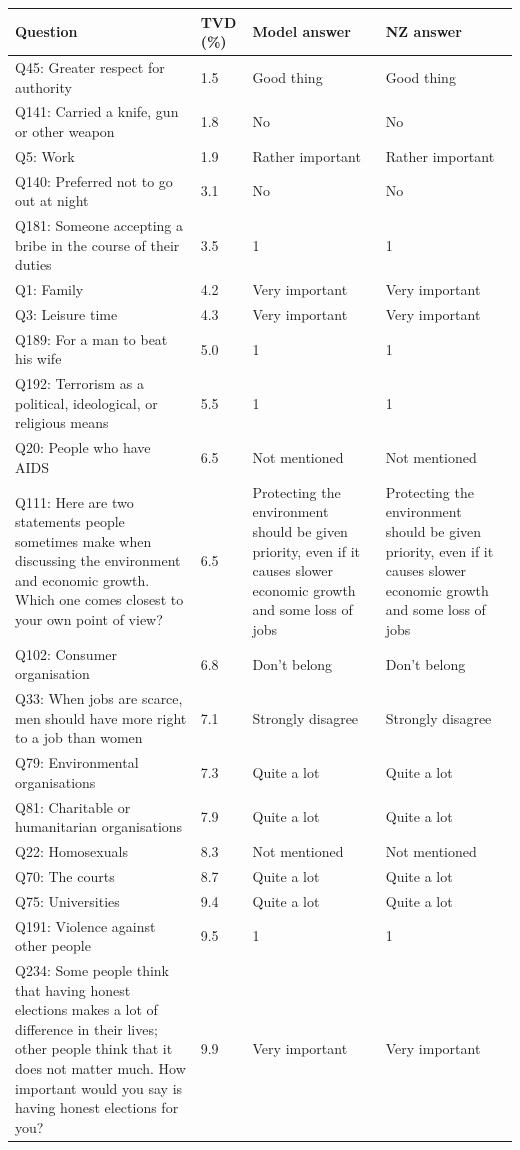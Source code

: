 \begin{tabular}{p{3.1in}lp{1.05in}p{1.05in}}
\toprule
Question & TVD (\%) & Model answer & NZ answer \\
\midrule
Q45: Greater respect for authority & 1.5 & Good thing & Good thing \\
Q141: Carried a knife, gun or other weapon & 1.8 & No & No \\
Q5: Work & 1.9 & Rather important & Rather important \\
Q140: Preferred not to go out at night & 3.1 & No & No \\
Q181: Someone accepting a bribe in the course of their duties & 3.5 & 1 & 1 \\
Q1: Family & 4.2 & Very important & Very important \\
Q3: Leisure time & 4.3 & Very important & Very important \\
Q189: For a man to beat his wife & 5.0 & 1 & 1 \\
Q192: Terrorism as a political, ideological, or religious means & 5.5 & 1 & 1 \\
Q20: People who have AIDS & 6.5 & Not mentioned & Not mentioned \\
Q111: Here are two statements people sometimes make when discussing the environment and economic growth. Which one comes closest to your own point of view? & 6.5 & Protecting the environment should be given priority, even if it causes slower economic growth and some loss of jobs & Protecting the environment should be given priority, even if it causes slower economic growth and some loss of jobs \\
Q102: Consumer organisation & 6.8 & Don't belong & Don't belong \\
Q33: When jobs are scarce, men should have more right to a job than women & 7.1 & Strongly disagree & Strongly disagree \\
Q79: Environmental organisations & 7.3 & Quite a lot & Quite a lot \\
Q81: Charitable or humanitarian organisations & 7.9 & Quite a lot & Quite a lot \\
Q22: Homosexuals & 8.3 & Not mentioned & Not mentioned \\
Q70: The courts & 8.7 & Quite a lot & Quite a lot \\
Q75: Universities & 9.4 & Quite a lot & Quite a lot \\
Q191: Violence against other people & 9.5 & 1 & 1 \\
Q234: Some people think that having honest elections makes a lot of difference in their lives; other people think that it does not matter much. How important would you say is having honest elections for you? & 9.9 & Very important & Very important \\

\end{tabular}

